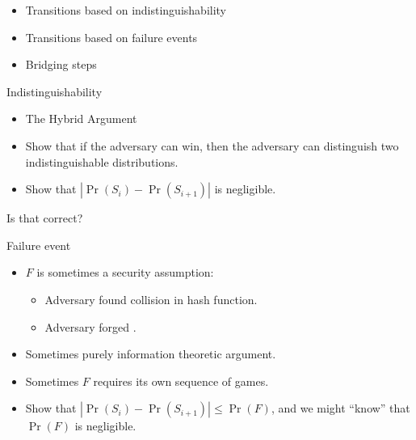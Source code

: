 \begin{frame}
  \begin{itemize}
    \item Transitions based on indistinguishability

    \item Transitions based on failure events

    \item Bridging steps
  \end{itemize}
\end{frame}

\begin{frame}
  \begin{block}{Indistinguishability}
    \begin{itemize}
      \item The Hybrid Argument
      \item Show that if the adversary can win, then the adversary can 
        distinguish two indistinguishable distributions.

        \pause{}

      \item \color{red} Show that \(|\Pr(S_i) - \Pr(S_{i+1})|\) is negligible.
    \end{itemize}
  \end{block}

  \begin{question}
    Is that correct?
  \end{question}
\end{frame}

\begin{frame}
  \begin{block}{Failure event}
    \begin{itemize}

      \item \(F\) is sometimes a security assumption:
        \begin{itemize}
          \item Adversary found collision in hash function.
          \item Adversary forged .
        \end{itemize}

        \pause{}

      \item Sometimes purely information theoretic argument.

      \item Sometimes \(F\) requires its own sequence of games.

        \pause{}

      \item \color{red} Show that \(|\Pr(S_i) - \Pr(S_{i+1})|\leq \Pr(F)\), and 
        we might \enquote{know} that \(\Pr(F)\) is negligible.

    \end{itemize}
  \end{block}
\end{frame}

